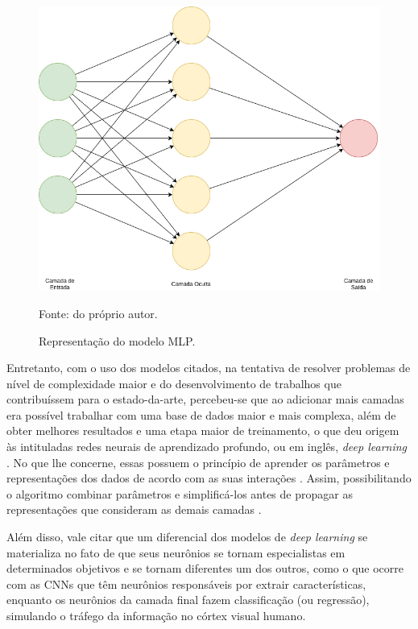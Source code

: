 \begin{figure}[H]
    \centering
    \caption{Representação do modelo MLP.}
    \includegraphics[width=1\linewidth]{recursos/imagens/deep/mlp.png}
    \label{deep:fig:4}

    Fonte: do próprio autor.
\end{figure}

Entretanto, com o uso dos modelos citados, na tentativa de resolver problemas de nível de complexidade maior e do desenvolvimento de trabalhos que contribuíssem para o estado-da-arte, percebeu-se que ao adicionar mais camadas era possível trabalhar com uma base de dados maior e mais complexa, além de obter melhores resultados e uma etapa maior de treinamento, o que deu origem às intituladas redes neurais de aprendizado profundo, ou em inglês, \textit{deep learning} \citep{Goodfellow2016}. No que lhe concerne, essas possuem o princípio de aprender os parâmetros e representações dos dados de acordo com as suas interações \citep{ponti2018funciona}. Assim, possibilitando o algoritmo combinar parâmetros e simplificá-los antes de propagar as representações que consideram as demais camadas \citep{Goodfellow2016}.

Além disso, vale citar que um diferencial dos modelos de \textit{deep learning} se materializa no fato de que seus neurônios se tornam especialistas em determinados objetivos e se tornam diferentes um dos outros, como o que ocorre com as CNNs que têm neurônios responsáveis por extrair características, enquanto os neurônios da camada final fazem classificação (ou regressão), simulando o tráfego da informação no córtex visual humano.

